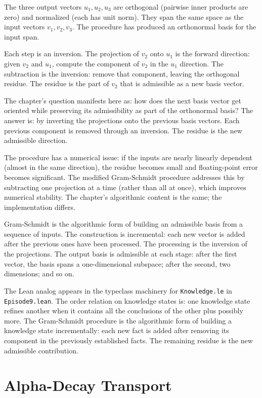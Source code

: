 The three output vectors $u_1, u_2, u_3$ are orthogonal (pairwise
inner products are zero) and normalized (each has unit norm). They
span the same space as the input vectors $v_1, v_2, v_3$. The
procedure has produced an orthonormal basis for the input span.

Each step is an inversion. The projection of $v_2$ onto $u_1$ is
the forward direction: given $v_2$ and $u_1$, compute the
component of $v_2$ in the $u_1$ direction. The subtraction is the
inversion: remove that component, leaving the orthogonal residue.
The residue is the part of $v_2$ that is admissible as a new basis
vector.

The chapter's question manifests here as: how does the next basis
vector get oriented while preserving its admissibility as part of
the orthonormal basis? The answer is: by inverting the projections
onto the previous basis vectors. Each previous component is removed
through an inversion. The residue is the new admissible direction.

The procedure has a numerical issue: if the inputs are nearly
linearly dependent (almost in the same direction), the residue
becomes small and floating-point error becomes significant. The
modified Gram-Schmidt procedure addresses this by subtracting one
projection at a time (rather than all at once), which improves
numerical stability. The chapter's algorithmic content is the
same; the implementation differs.

Gram-Schmidt is the algorithmic form of building an admissible
basis from a sequence of inputs. The construction is incremental:
each new vector is added after the previous ones have been
processed. The processing is the inversion of the projections.
The output basis is admissible at each stage: after the first
vector, the basis spans a one-dimensional subspace; after the
second, two dimensions; and so on.

The Lean analog appears in the typeclass machinery for
\texttt{Knowledge.le} in \texttt{Episode9.lean}. The order
relation on knowledge states is: one knowledge state refines
another when it contains all the conclusions of the other plus
possibly more. The Gram-Schmidt procedure is the algorithmic
form of building a knowledge state incrementally: each new
fact is added after removing its component in the previously
established facts. The remaining residue is the new admissible
contribution.

\section{Alpha-Decay Transport}
\label{se:alpha-decay-transport}

